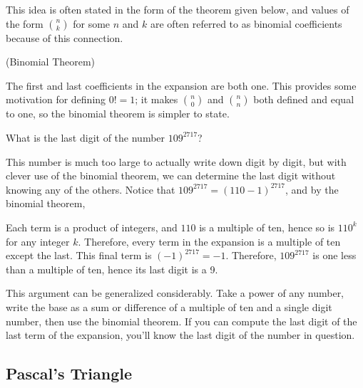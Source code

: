 \par
This idea is often stated in the form of the theorem given below, and values of the form $\binom{n}{k}$ for some $n$ and $k$ are often referred to as binomial coefficients  because of this connection.
\par
\begin{thm}(Binomial Theorem) 
\end{thm}
\par
\rmk The first and last coefficients in the expansion are both one. This provides some motivation for defining $0! = 1$; it makes $\binom{n}{0}$ and $\binom{n}{n}$ both defined and equal to one, so the binomial theorem is simpler to state.
\begin{examp}
What is the last digit of the number $109^{2717}$?
\par
\noindent This number is much too large to actually write down digit by digit, but with clever use of the binomial theorem, we can determine the last digit without knowing any of the others. Notice that $109^{2717} = (110 - 1)^{2717}$, and by the binomial theorem,
\par
\noindent Each term is a product of integers, and $110$ is a multiple of ten, hence so is $110^k$ for any integer $k$. Therefore, every term in the expansion is a multiple of ten except the last. This final term is $(-1)^{2717} = -1$. Therefore, $109^{2717}$ is one less than a multiple of ten, hence its last digit is a 9.
\par
\noindent
This argument can be generalized considerably. Take a power of any number, write the base as a sum or difference of a multiple of ten and a single digit number, then use the binomial theorem. If you can compute the last digit of the last term of the expansion, you'll know the last digit of the number in question.
\end{examp}

\subsection*{Pascal's Triangle}

